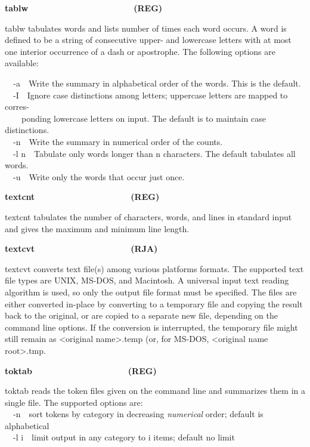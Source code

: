 {\sffamily\bfseries
tablw\ \ \ \ \ \ \ \ \ \ \ \ \ \ \ \ \ \ \ \ \ \ (REG)}

\textsf{tablw} tabulates words and lists number of times each word
occurs. A word is defined to be a string of consecutive upper- and
lowercase letters with at most one interior occurrence of a dash or
apostrophe. The following options are available:

\texttt{\ \ }\textsf{{}-a}\ \ Write the summary in alphabetical order of
the words. This is the default.\\
\ \ \textsf{{}-I}\ \ Ignore case distinctions among letters; uppercase
letters are mapped to corres-\\
\ \  \ \ ponding lowercase letters on input. The default is to maintain
case distinctions.\\
\ \ \textsf{{}-n}\ \ Write the summary in numerical order of the
counts.\\
\ \ \textsf{{}-l n}\ \ Tabulate only words longer than n characters. The
default tabulates all words.\\
\ \ \textsf{{}-u}\ \ Write only the words that occur just once.

{\sffamily\bfseries
textcnt\ \ \ \ \ \ \ \ \ \ \ \ \ \ \ \ \ \ \ \ (REG)}

\textsf{textcnt} tabulates the number of characters,
{\textquotedbl}words{\textquotedbl}, and lines in standard input and
gives the maximum and minimum line length. 

{\sffamily\bfseries
textcvt\ \ \ \ \ \ \ \ \ \ \ \ \ \ \ \ \ \ \ \ (RJA)}

\textsf{textcvt} converts text file(s) among various
platforms{\textquotesingle} formats. The supported text file types are
UNIX, MS-DOS, and Macintosh. A universal input text reading algorithm
is used, so only the output file format must be specified. The files
are either converted in-place by converting to a temporary file and
copying the result back to the original, or are copied to a separate
new file, depending on the command line options. If the conversion is
interrupted, the temporary file might still remain as
{\textless}original name{\textgreater}.temp (or, for MS-DOS,
{\textless}original name root{\textgreater}.tmp.

{\sffamily\bfseries
toktab\ \ \ \ \ \ \ \ \ \ \ \ \ \ \ \ \ \ \ \ (REG)}

\textsf{toktab} reads the token files given on the command line and
summarizes them in a single file. The supported options are:\\
\ \ \textsf{{}-n}\ \ sort tokens by category in decreasing
\textit{numerical} order; default is alphabetical\\
\ \ \textsf{{}-l i}\ \ limit output in any category to i items; default
no limit


